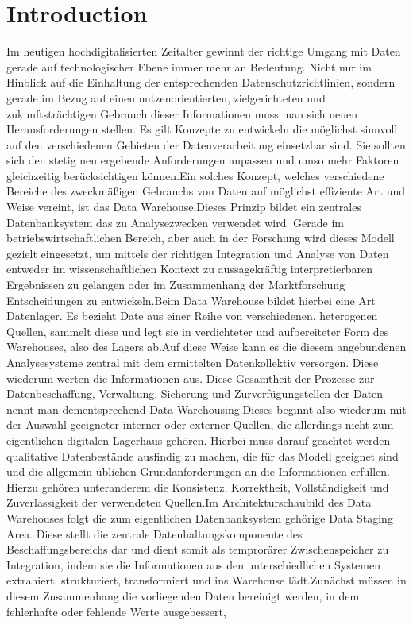 \documentclass[sigconf]{acmart}
\begin{document}
\section{Introduction}
Im heutigen hochdigitalisierten Zeitalter gewinnt der richtige Umgang mit Daten gerade auf technologischer Ebene immer mehr an Bedeutung. Nicht nur im Hinblick auf die Einhaltung der entsprechenden Datenschutzrichtlinien, sondern gerade im Bezug auf einen nutzenorientierten, zielgerichteten und zukunftsträchtigen Gebrauch dieser Informationen muss man sich neuen Herausforderungen stellen. Es gilt Konzepte zu entwickeln die möglichst sinnvoll auf den verschiedenen Gebieten der Datenverarbeitung einsetzbar sind. Sie sollten sich den stetig neu ergebende Anforderungen anpassen und umso mehr Faktoren gleichzeitig berücksichtigen können.\newline Ein solches Konzept, welches verschiedene Bereiche des zweckmäßigen Gebrauchs von Daten auf möglichst effiziente Art und Weise vereint, ist das Data Warehouse.\newline Dieses Prinzip bildet ein zentrales Datenbanksystem das zu Analysezwecken verwendet wird. Gerade im betriebswirtschaftlichen Bereich, aber auch in der Forschung wird dieses Modell gezielt eingesetzt, um mittels der richtigen Integration und Analyse von Daten entweder im wissenschaftlichen Kontext zu aussagekräftig interpretierbaren Ergebnissen zu gelangen oder im Zusammenhang der Marktforschung Entscheidungen zu entwickeln.\newline Beim Data Warehouse bildet hierbei eine Art Datenlager. Es bezieht  Date aus einer Reihe von verschiedenen, heterogenen Quellen, sammelt diese und legt sie in verdichteter und aufbereiteter Form des Warehouses, also des Lagers ab.\newline Auf diese Weise kann es die diesem angebundenen Analysesysteme zentral mit dem ermittelten Datenkollektiv versorgen. Diese wiederum werten die Informationen aus. Diese Gesamtheit der Prozesse zur Datenbeschaffung, Verwaltung, Sicherung und Zurverfügungstellen der Daten nennt man dementsprechend Data Warehousing.\newline Dieses beginnt also wiederum mit der Auswahl geeigneter interner oder externer Quellen, die allerdings nicht zum eigentlichen digitalen Lagerhaus gehören. Hierbei muss darauf geachtet werden qualitative Datenbestände ausfindig zu machen, die für das Modell geeignet sind und die allgemein üblichen Grundanforderungen an die Informationen erfüllen. Hierzu gehören unteranderem die Konsistenz, Korrektheit, Vollständigkeit und Zuverlässigkeit der verwendeten Quellen.\newline Im  Architekturschaubild des Data Warehouses folgt die zum eigentlichen Datenbanksystem gehörige Data Staging Area. Diese stellt die zentrale Datenhaltungskomponente des Beschaffungsbereichs dar und dient somit als temprorärer Zwischenspeicher zu Integration, indem sie die Informationen aus den unterschiedlichen Systemen extrahiert, strukturiert, transformiert und ins Warehouse lädt.\newline Zunächst müssen in diesem Zusammenhang  die vorliegenden Daten bereinigt werden, in dem fehlerhafte oder fehlende Werte ausgebessert, 
\end{document}
